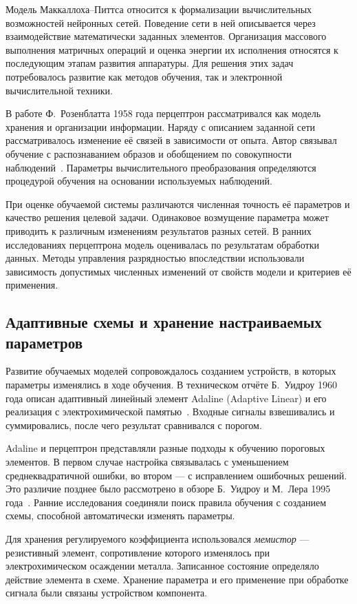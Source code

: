 Модель Маккаллоха--Питтса относится к формализации вычислительных
возможностей нейронных сетей. Поведение сети в ней описывается через взаимодействие математически заданных
элементов.
Организация массового выполнения матричных операций и оценка энергии
их исполнения относятся к последующим этапам развития аппаратуры.
Для решения этих задач потребовалось развитие как методов обучения, так и
электронной вычислительной техники.

В работе Ф.~Розенблатта 1958 года перцептрон рассматривался как модель
хранения и организации информации. Наряду с описанием заданной сети рассматривалось изменение её связей в
зависимости от опыта.
Автор связывал обучение с распознаванием образов и обобщением
по совокупности наблюдений~\cite{rosenblatt1958}.
Параметры вычислительного преобразования определяются процедурой
обучения на основании используемых наблюдений.

При оценке обучаемой системы различаются численная точность её параметров и
качество решения целевой задачи. Одинаковое возмущение
параметра может приводить к различным изменениям результатов разных
сетей. В ранних исследованиях перцептрона модель оценивалась по результатам обработки
данных. Методы управления
разрядностью впоследствии использовали зависимость допустимых численных
изменений от свойств модели и критериев её применения.

\subsection{Адаптивные схемы и хранение настраиваемых параметров}

Развитие обучаемых моделей сопровождалось созданием устройств,
в которых параметры изменялись в ходе обучения. В техническом
отчёте Б.~Уидроу 1960 года описан адаптивный линейный элемент
Adaline (Adaptive Linear) и его реализация с электрохимической
памятью~\cite{widrow1960memistor}. Входные сигналы взвешивались
и суммировались, после чего результат сравнивался с порогом.

Adaline и перцептрон представляли разные подходы к обучению
пороговых элементов. В первом случае настройка связывалась
с уменьшением среднеквадратичной ошибки, во втором —
с исправлением ошибочных решений. Это различие позднее
было рассмотрено в обзоре Б.~Уидроу
и М.~Лера 1995 года~\cite{widrow1995}.
Ранние исследования соединяли поиск правила обучения
с созданием схемы, способной автоматически изменять параметры.

Для хранения регулируемого коэффициента использовался
\textit{мемистор} — резистивный элемент, сопротивление которого
изменялось при электрохимическом осаждении металла.
Записанное состояние определяло действие элемента в схеме.
Хранение параметра и его применение при обработке сигнала
были связаны устройством компонента.

